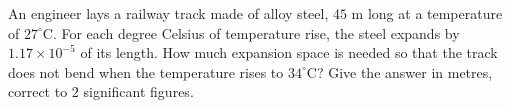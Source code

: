 An engineer lays a railway track made of alloy steel, $45$ m long at a temperature of $27^\circ$C. For each degree Celsius of temperature rise, the steel expands by $1.17\times10^{-5}$ of its length. How much expansion space is needed so that the track does not bend when the temperature rises to $34^\circ$C? Give the answer in metres, correct to $2$ significant figures.
